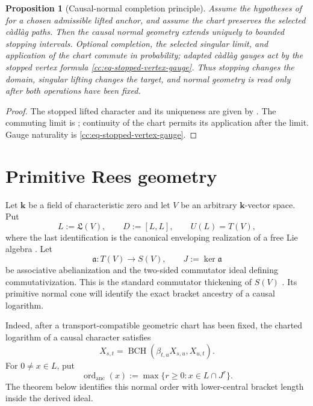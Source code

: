 \documentclass[10pt,reqno]{amsart}
\theoremstyle{plain}
\newtheorem{proposition}[theorem]{Proposition}
\theoremstyle{definition}
\theoremstyle{remark}
\begin{document}
\begin{proposition}[Causal-normal completion principle]
\label{cc:prop-causal-normal-completion}
Assume the hypotheses of
 for a
chosen admissible lifted anchor, and assume the chart preserves the selected
c\`adl\`ag paths.  Then the causal normal geometry extends uniquely to
bounded stopping intervals.  Optional completion, the selected singular
limit, and application of the chart commute in probability; adapted
c\`adl\`ag gauges act by the stopped vertex formula
\eqref{cc:eq-stopped-vertex-gauge}.  Thus stopping changes the domain,
singular lifting changes the target, and normal geometry is read only after
both operations have been fixed.
\end{proposition}

\begin{proof}
The stopped lifted character and its uniqueness are given by
.  The commuting limit is
; continuity of the chart permits
its application after the limit.  Gauge naturality is
\eqref{cc:eq-stopped-vertex-gauge}.
\end{proof}
\section{Primitive Rees geometry}
\label{cc:sec-algebraic-ancestry}

Let \(\mathbf k\) be a field of characteristic zero and let \(V\) be an
arbitrary \(\mathbf k\)-vector space.  Put
\[
 L:={\mathfrak L}(V),\qquad D:=[L,L],\qquad U(L)=T(V),
\]
where the last identification is the canonical enveloping realization of a
free Lie algebra \cite[Thm.~0.5]{Reutenauer93}.  Let
\[
 \mathfrak a:T(V)\longrightarrow S(V),\qquad
 J:=\ker\mathfrak a
\]
be associative abelianization and the two-sided commutator ideal defining
commutativization.  This is the standard commutator thickening of \(S(V)\)
\cite{Kapranov98,FeiginShoikhet07,JordanOrem13}.  Its primitive normal
cone will identify the exact bracket ancestry of a causal logarithm.

Indeed, after a transport-compatible geometric chart has been fixed, the
charted logarithm of a causal character satisfies
\[
 X_{s,t}={\operatorname{BCH}}\!\left(\beta_{t,u}X_{s,u},X_{u,t}\right).
\]
For \(0\ne x\in L\), put
\[
 \operatorname{ord}_{\mathrm{anc}}(x)
 :=\max\{r\geq0:x\in L\cap J^r\}.
\]
The theorem below identifies this normal order with lower-central bracket
length inside the derived ideal.
\end{document}
